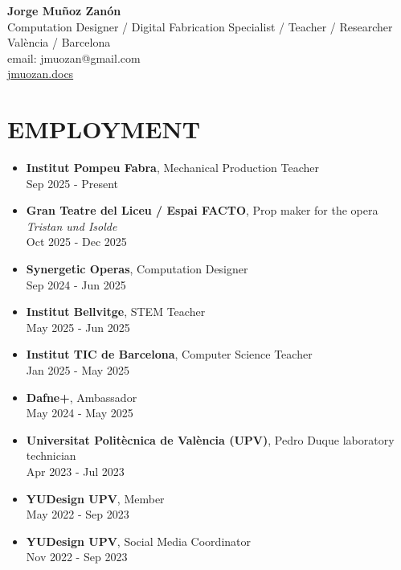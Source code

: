 \documentclass[11pt,a4paper]{article}
\begin{document}
\begin{center}
\textbf{\Large Jorge Muñoz Zanón}\\
\vspace{0.1cm}
Computation Designer / Digital Fabrication Specialist / Teacher / Researcher\\
València / Barcelona\\
email: jmuozan@gmail.com\\
\href{https://jmuozan.github.io/docs/}{jmuozan.docs}
\end{center}


\section*{EMPLOYMENT}
\begin{itemize}[leftmargin=*,label={},itemsep=6pt]
    \item \textbf{Institut Pompeu Fabra}, Mechanical Production Teacher\\
    Sep 2025 - Present

    \item \textbf{Gran Teatre del Liceu / Espai FACTO}, Prop maker for the opera \textit{Tristan und Isolde}\\
    Oct 2025 - Dec 2025

    \item \textbf{Synergetic Operas}, Computation Designer\\
    Sep 2024 - Jun 2025

    \item \textbf{Institut Bellvitge}, STEM Teacher\\
    May 2025 - Jun 2025 
    
    \item \textbf{Institut TIC de Barcelona}, Computer Science Teacher\\
    Jan 2025 - May 2025 
    
    \item \textbf{Dafne+}, Ambassador\\
    May 2024 - May 2025 
    
    \item \textbf{Universitat Politècnica de València (UPV)}, Pedro Duque laboratory technician\\
    Apr 2023 - Jul 2023 
    
    \item \textbf{YUDesign UPV}, Member\\
    May 2022 - Sep 2023 
    
    \item \textbf{YUDesign UPV}, Social Media Coordinator\\
    Nov 2022 - Sep 2023 
\end{itemize}
\end{document}
